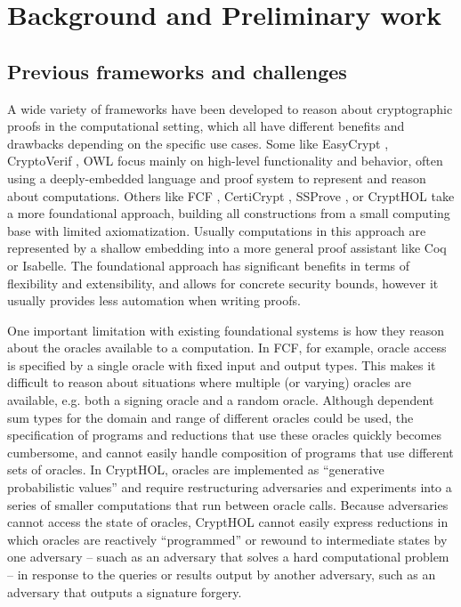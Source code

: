 \section{Background and Preliminary work}


\subsection{Previous frameworks and challenges}
A wide variety of frameworks have been developed to reason about cryptographic proofs in the computational setting, which all have different benefits and drawbacks depending on the specific use cases.
Some like EasyCrypt \cite{canetti2019easyuc}, CryptoVerif \cite{blanchet2007cryptoverif}, OWL \cite{gancher2023owl} focus mainly on high-level functionality and behavior, often using a deeply-embedded language and proof system to represent and reason about computations.
Others like FCF \cite{FCF,petcher2015foundational}, CertiCrypt \cite{zanella2010formal}, SSProve \cite{abate2021ssprove}, or CryptHOL \cite{basin2020crypthol} take a more foundational approach, building all constructions from a small computing base with limited axiomatization.
Usually computations in this approach are represented by a shallow embedding into a more general proof assistant like Coq or Isabelle.
The foundational approach has significant benefits in terms of flexibility and extensibility, and allows for concrete security bounds,
however it usually provides less automation when writing proofs.

One important limitation with existing foundational systems is how they reason about the oracles available to a computation.
In FCF, for example, oracle access is specified by a single oracle with fixed input and output types. This makes it difficult to reason about situations where multiple (or varying) oracles are available, e.g. both a signing oracle and a random oracle.  Although dependent sum types for the domain and range of different oracles could be used, the specification of programs and reductions that use these oracles quickly becomes cumbersome, and cannot easily handle composition of programs that use different sets of oracles.
In CryptHOL, oracles are implemented as ``generative probabilistic values'' and require restructuring adversaries and experiments into a series of smaller computations that run between oracle calls.  Because adversaries cannot access the state of oracles, CryptHOL cannot easily express reductions in which oracles are reactively ``programmed'' or rewound to intermediate states by one adversary -- suach as an adversary that solves a hard computational problem -- in response to the queries or results output by another adversary, such as an adversary that outputs a signature forgery.

